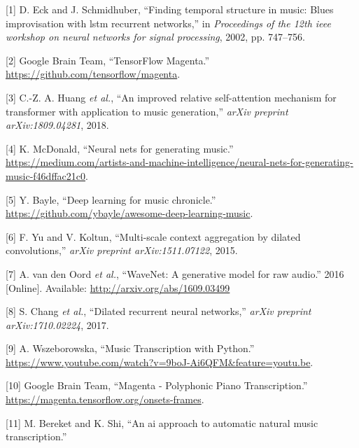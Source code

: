 \documentclass[12pt,]{article}
\begin{document}
\hypertarget{refs}{}
\leavevmode\hypertarget{ref-eck2002finding}{}%
{[}1{]} D. Eck and J. Schmidhuber, ``Finding temporal structure in
music: Blues improvisation with lstm recurrent networks,'' in
\emph{Proceedings of the 12th ieee workshop on neural networks for
signal processing}, 2002, pp. 747--756.

\leavevmode\hypertarget{ref-magenta}{}%
{[}2{]} \relax Google Brain Team, ``TensorFlow Magenta.'' \\
\url{https://github.com/tensorflow/magenta}.

\leavevmode\hypertarget{ref-huang2018improved}{}%
{[}3{]} C.-Z. A. Huang \emph{et al.}, ``An improved relative
self-attention mechanism for transformer with application to music
generation,'' \emph{arXiv preprint arXiv:1809.04281}, 2018.

\leavevmode\hypertarget{ref-mediumkylemcdonald}{}%
{[}4{]} K. McDonald, ``Neural nets for generating music.'' \\
\url{https://medium.com/artists-and-machine-intelligence/neural-nets-for-generating-music-f46dffac21c0}.

\leavevmode\hypertarget{ref-libdlmusic}{}%
{[}5{]} Y. Bayle, ``Deep learning for music chronicle.'' \\
\url{https://github.com/ybayle/awesome-deep-learning-music}.

\leavevmode\hypertarget{ref-yu2015multi}{}%
{[}6{]} F. Yu and V. Koltun, ``Multi-scale context aggregation by
dilated convolutions,'' \emph{arXiv preprint arXiv:1511.07122}, 2015.

\leavevmode\hypertarget{ref-oord2016wavenet}{}%
{[}7{]} A. van den Oord \emph{et al.}, ``WaveNet: A generative model for
raw audio.'' 2016 {[}Online{]}. Available:
\url{http://arxiv.org/abs/1609.03499}

\leavevmode\hypertarget{ref-chang2017dilated}{}%
{[}8{]} S. Chang \emph{et al.}, ``Dilated recurrent neural networks,''
\emph{arXiv preprint arXiv:1710.02224}, 2017.

\leavevmode\hypertarget{ref-annaw}{}%
{[}9{]} A. Wszeborowska, ``Music Transcription with Python.'' \\
\url{https://www.youtube.com/watch?v=9boJ-Ai6QFM\&feature=youtu.be}.

\leavevmode\hypertarget{ref-magentaonsetframes}{}%
{[}10{]} \relax Google Brain Team, ``Magenta - Polyphonic Piano
Transcription.'' \\
\url{https://magenta.tensorflow.org/onsets-frames}.

\leavevmode\hypertarget{ref-bereketai}{}%
{[}11{]} M. Bereket and K. Shi, ``An ai approach to automatic natural
music transcription.''
\end{document}

